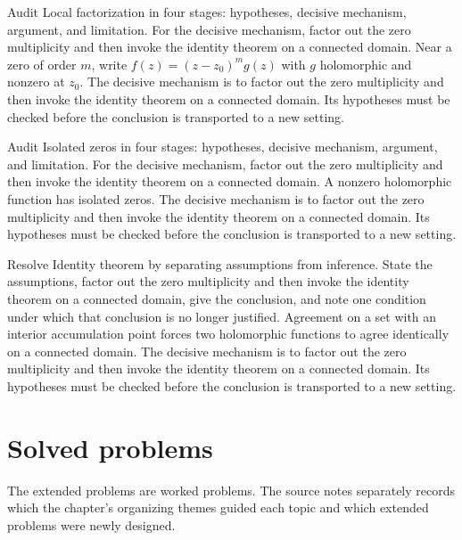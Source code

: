 \begin{example}\label{ex:iv07-worked-02}
Audit Local factorization in four stages: hypotheses, decisive mechanism, argument, and limitation. For the decisive mechanism, factor out the zero multiplicity and then invoke the identity theorem on a connected domain. Near a zero of order $m$, write $f(z)=(z-z_0)^mg(z)$ with $g$ holomorphic and nonzero at $z_0$. The decisive mechanism is to factor out the zero multiplicity and then invoke the identity theorem on a connected domain. Its hypotheses must be checked before the conclusion is transported to a new setting.
\end{example}

\begin{example}\label{ex:iv07-worked-03}
Audit Isolated zeros in four stages: hypotheses, decisive mechanism, argument, and limitation. For the decisive mechanism, factor out the zero multiplicity and then invoke the identity theorem on a connected domain. A nonzero holomorphic function has isolated zeros. The decisive mechanism is to factor out the zero multiplicity and then invoke the identity theorem on a connected domain. Its hypotheses must be checked before the conclusion is transported to a new setting.
\end{example}

\begin{example}\label{ex:iv07-worked-04}
Resolve Identity theorem by separating assumptions from inference. State the assumptions, factor out the zero multiplicity and then invoke the identity theorem on a connected domain, give the conclusion, and note one condition under which that conclusion is no longer justified. Agreement on a set with an interior accumulation point forces two holomorphic functions to agree identically on a connected domain. The decisive mechanism is to factor out the zero multiplicity and then invoke the identity theorem on a connected domain. Its hypotheses must be checked before the conclusion is transported to a new setting.
\end{example}

\section{Solved problems}
The extended problems are worked problems. The source notes separately records which the chapter's organizing themes guided each topic and which extended problems were newly designed.

